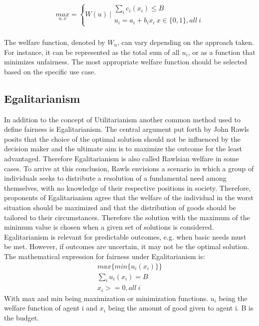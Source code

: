 \documentclass[german, a4paper, 11pt, oneside]{scrbook}
\begin{document}
\begin{align}
  \underset{u,x}{max}  = \left\{ W(u)\ | \begin{array}{l}
    \sum_{i} c_i(x_i) \le B\\
    u_i=a_i + b_i x_i \ x \in \{0,1\}, all\ i
  \end{array}\right.
\end{align}
\cite{XinyingChen.2023} \\
The welfare function, denoted by $W_u$, can vary depending on the approach taken. For instance, it can be represented as the total sum of all $u_i$, or as a function that minimizes unfairness. 
The most appropriate welfare function should be selected based on the specific use case. \cite{XinyingChen.2023}

\subsection{Egalitarianism}
In addition to the concept of Utilitarianism another common method used to define fairness is Egalitarianism. The central argument put forth by John Rawls posits that the choice of the optimal solution should not be influenced by the decision maker and the ultimate aim is to maximize the outcome for the least advantaged. \cite{XinyingChen.2023,.} Therefore Egalitarianism is also called Rawlsian welfare in some cases. To arrive at this conclusion, Rawls envisions a scenario in which a group of individuals seeks to distribute a resolution of a fundamental need among themselves, with no knowledge of their respective positions in society. Therefore, proponents of Egalitarianism agree that the welfare of the individual in the worst situation should be maximized and that the distribution of goods should be tailored to their circumstances. Therefore the solution with the maximum of the minimum value is chosen when a given set of solutions is considered. \\
 \cite{XinyingChen.2023,.,FelixBrandtVincentConitzerUlleEndrissJeromeLangandArielD.Procaccia.} Egalitarianism is relevant for predictable outcomes, e.g. when basic needs must be met.\cite{.} However, if outcomes are uncertain, it may not be the optimal solution. The mathematical expression for fairness under Egalitarianism is: \cite{.}
\begin{align}
max\{ min\{u_i(x_i)\}\}\\
\sum_{i}u_i(x_i) = B\\
x_i>=0, all\   i
\end{align}
With max and min being maximization or minimization functions. $u_i$ being the welfare function of agent i and $x_i$ being the amount of good given to agent i. B is the budget.
\end{document}
